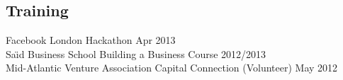\documentclass[margin]{res}
\newcommand{\locdatesubsection}[3]{\textbf{#1} (#2) \hfill #3}
\newcommand{\nbdatesubsection}[2]{#1 \hfill #2 }
\begin{document}
\begin{sloppypar}
\begin{resume}
%


\section{Training}
\nbdatesubsection{Facebook London Hackathon}{Apr 2013} \\
\nbdatesubsection{Sa\"\i d Business School Building a Business Course}{2012/2013} \\
\nbdatesubsection{Mid-Atlantic Venture Association Capital Connection (Volunteer)}{May 2012}


\end{resume}
\end{sloppypar}
\end{document}
